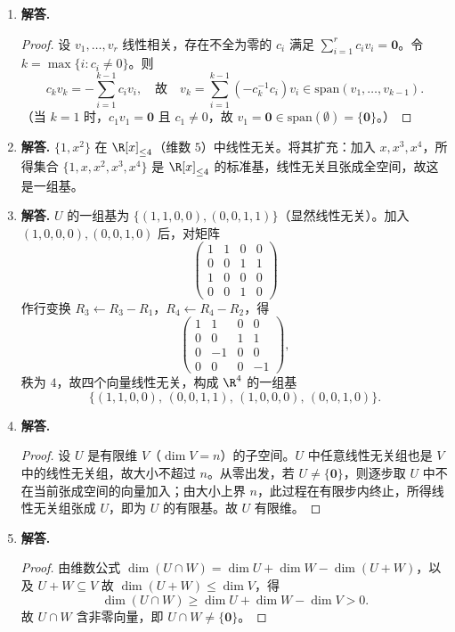 \begin{enumerate}[label=\textbf{\arabic*.}, leftmargin=*, itemsep=1em]
\item \textbf{解答.}
\begin{proof}
设 $v_1,\dots,v_r$ 线性相关，存在不全为零的 $c_i$ 满足 $\sum_{i=1}^r c_iv_i=\mathbf{0}$。令 $k=\max\{i:c_i\ne 0\}$。则
\[
c_kv_k=-\sum_{i=1}^{k-1}c_iv_i,\quad\text{故}\quad v_k=\sum_{i=1}^{k-1}\!\left(-c_k^{-1}c_i\right)v_i\in\mathrm{span}(v_1,\dots,v_{k-1}).
\]
（当 $k=1$ 时，$c_1v_1=\mathbf{0}$ 且 $c_1\ne 0$，故 $v_1=\mathbf{0}\in\mathrm{span}(\emptyset)=\{\mathbf{0}\}$。）
\end{proof}

\item \textbf{解答.}
$\{1,x^2\}$ 在 $\R[x]_{\le 4}$（维数 $5$）中线性无关。将其扩充：加入 $x,x^3,x^4$，所得集合 $\{1,x,x^2,x^3,x^4\}$ 是 $\R[x]_{\le 4}$ 的标准基，线性无关且张成全空间，故这是一组基。

\item \textbf{解答.}
$U$ 的一组基为 $\{(1,1,0,0),(0,0,1,1)\}$（显然线性无关）。加入 $(1,0,0,0),(0,0,1,0)$ 后，对矩阵
\[
\begin{pmatrix}1&1&0&0\\0&0&1&1\\1&0&0&0\\0&0&1&0\end{pmatrix}
\]
作行变换 $R_3\leftarrow R_3-R_1$，$R_4\leftarrow R_4-R_2$，得
\[
\begin{pmatrix}1&1&0&0\\0&0&1&1\\0&-1&0&0\\0&0&0&-1\end{pmatrix},
\]
秩为 $4$，故四个向量线性无关，构成 $\R^4$ 的一组基
\[
\{(1,1,0,0),\,(0,0,1,1),\,(1,0,0,0),\,(0,0,1,0)\}.
\]

\item \textbf{解答.}
\begin{proof}
设 $U$ 是有限维 $V$（$\dim V=n$）的子空间。$U$ 中任意线性无关组也是 $V$ 中的线性无关组，故大小不超过 $n$。从零出发，若 $U\ne\{\mathbf{0}\}$，则逐步取 $U$ 中不在当前张成空间的向量加入；由大小上界 $n$，此过程在有限步内终止，所得线性无关组张成 $U$，即为 $U$ 的有限基。故 $U$ 有限维。
\end{proof}

\item \textbf{解答.}
\begin{proof}
由维数公式 $\dim(U\cap W)=\dim U+\dim W-\dim(U+W)$，以及 $U+W\subseteq V$ 故 $\dim(U+W)\le\dim V$，得
\[
\dim(U\cap W)\ge\dim U+\dim W-\dim V>0.
\]
故 $U\cap W$ 含非零向量，即 $U\cap W\ne\{\mathbf{0}\}$。
\end{proof}


\end{enumerate}
